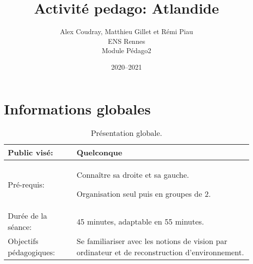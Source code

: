 \documentclass[a4paper,11pt]{article}
\begin{document}
\title{Activité pedago: Atlandide}
\author{Alex Coudray, Matthieu Gillet et Rémi Piau \\ ENS Rennes \\ Module Pédago2}
\date{2020--2021}

\maketitle

\section{Informations globales}

\begin{table}[h]
    \centering
    \begin{tabular}{|m{4cm}|m{11.5cm}|}
        \hline
        \vspace{0.2cm} Public visé: \vspace{0.2cm}
        & \vspace{0.2cm} Quelconque \vspace{0.2cm} \\
            
        \hline
        \vspace{0.2cm} Pré-requis: \vspace{0.2cm} & \vspace{0.2cm} Connaître sa droite et sa gauche.
        
        Organisation seul puis en groupes de 2.\\
        \hline
        \vspace{0.2cm} Durée de la séance: \vspace{0.2cm}
        & \vspace{0.2cm} 45 minutes, adaptable en 55 minutes. \vspace{0.2cm} \\
        \hline
        \vspace{0.2cm} Objectifs \newline pédagogiques: \vspace{0.2cm} 
        & \vspace{0.2cm} Se familiariser avec les notions de vision par ordinateur et de reconstruction d'environnement. \vspace{0.2cm} \\
        \hline
    \end{tabular}
    \caption{Présentation globale.}
    \label{tab:global}
\end{table}
\end{document}

